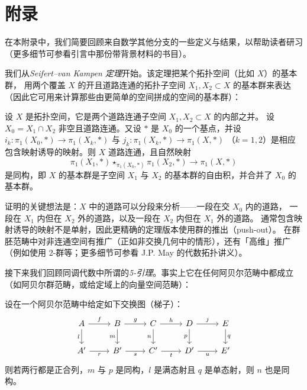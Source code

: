 \section{附录}

在本附录中，我们简要回顾来自数学其他分支的一些定义与结果，以帮助读者研习
（更多细节可参看引言中那份带背景材料的书目）。

我们从\emph{Seifert--van Kampen 定理}开始。该定理把某个拓扑空间（比如 $X$）的基本群，
用两个覆盖 $X$ 的开且道路连通的拓扑子空间 $X_1, X_2 \subset X$ 的基本群来表达
（因此它可用来计算那些由更简单的空间拼成的空间的基本群）：

 设 $X$ 是拓扑空间，它是两个道路连通子空间 $X_1, X_2 \subset X$ 的内部之并。
设 $X_0 = X_1 \cap X_2$ 非空且道路连通。又设 $*$ 是 $X_0$ 的一个基点，并设
$i_k : \pi_1(X_0, *) \to \pi_1(X_k, *)$ 与 $j_k : \pi_1(X_k, *) \to \pi_1(X, *)$
（$k = 1, 2$）是相应包含映射诱导的映射。则 $X$ 道路连通，且自然映射
\[
  \pi_1(X_1, *) \star_{\pi_1(X_0,*)} \pi_1(X_2, *) \to \pi_1(X, *)
\]
是同构，即 $X$ 的基本群是子空间 $X_1$ 与 $X_2$ 的基本群的自由积，并合并了 $X_0$ 的基本群。

证明的关键想法是：$X$ 中的道路可以分段来分析——一段在交 $X_0$ 内的道路，
一段在 $X_1$ 内但在 $X_2$ 外的道路，以及一段在 $X_2$ 内但在 $X_1$ 外的道路。
通常包含映射诱导的映射不是单射，因此更精确的定理版本使用群的推出（push-out）。
在群胚范畴中对非连通空间有推广（正如非交换几何中的情形），还有「高维」推广
（例如使用 2-群等；更多细节可参看 J.P. May 的代数拓扑讲义）。

接下来我们回顾同调代数中所谓的\emph{5-引理}。事实上它在任何阿贝尔范畴中都成立
（如阿贝尔群范畴，或给定域上的向量空间范畴）：

 设在一个阿贝尔范畴中给定如下交换图（梯子）：
\[
  \begin{tikzcd}
    A \arrow[r,"f"] \arrow[d,"l"'] & B \arrow[r,"g"] \arrow[d,"m"'] & C \arrow[r,"h"] \arrow[d,"n"'] & D \arrow[r,"j"] \arrow[d,"p"'] & E \arrow[d,"q"] \\
    A' \arrow[r,"r"'] & B' \arrow[r,"s"'] & C' \arrow[r,"t"'] & D' \arrow[r,"u"'] & E'
  \end{tikzcd}
\]
则若两行都是正合列，$m$ 与 $p$ 是同构，$l$ 是满态射且 $q$ 是单态射，则 $n$ 也是同构。

